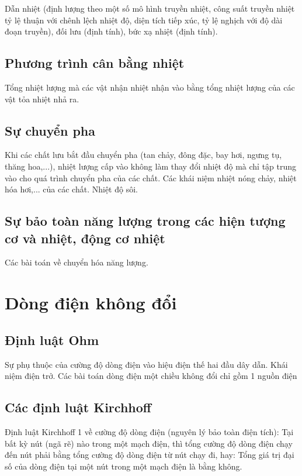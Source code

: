 \documentclass{article}
\begin{document}
\begin{multicols}{2}
Dẫn nhiệt (định lượng theo một số mô hình truyền nhiệt, công suất truyền nhiệt tỷ lệ thuận với chênh lệch nhiệt độ, diện tích tiếp xúc, tỷ lệ nghịch với độ dài đoạn truyền), đối lưu (định tính), bức xạ nhiệt (định tính).

\subsection{Phương trình cân bằng nhiệt}

Tổng nhiệt lượng mà các vật nhận nhiệt nhận vào bằng tổng nhiệt lượng của các vật tỏa nhiệt nhả ra.

\subsection{Sự chuyển pha}

Khi các chất lưu bắt đầu chuyển pha (tan chảy, đông đặc, bay hơi, ngưng tụ, thăng hoa,...), nhiệt lượng cấp vào không làm thay đổi nhiệt độ mà chỉ tập trung vào cho quá trình chuyển pha của các chất. Các khái niệm nhiệt nóng chảy, nhiệt hóa hơi,... của các chất. Nhiệt độ sôi.

\subsection{Sự bảo toàn năng lượng trong các hiện tượng cơ và nhiệt, động cơ nhiệt}

Các bài toán về chuyển hóa năng lượng.

\section{Dòng điện không đổi}

\subsection{Định luật Ohm}

Sự phụ thuộc của cường độ dòng điện vào hiệu điện thế hai đầu dây dẫn. Khái niệm điện trở. Các bài toán dòng điện một chiều không đổi chỉ gồm 1 nguồn điện

\subsection{Các định luật Kirchhoff}

Định luật Kirchhoff 1 về cường độ dòng điện (nguyên lý bảo toàn điện tích): Tại bất kỳ nút (ngã rẽ) nào trong một mạch điện, thì tổng cường độ dòng điện chạy đến nút phải bằng tổng cường độ dòng điện từ nút chạy đi, hay:
Tổng giá trị đại số của dòng điện tại một nút trong một mạch điện là bằng không.


\end{multicols}
\end{document}
